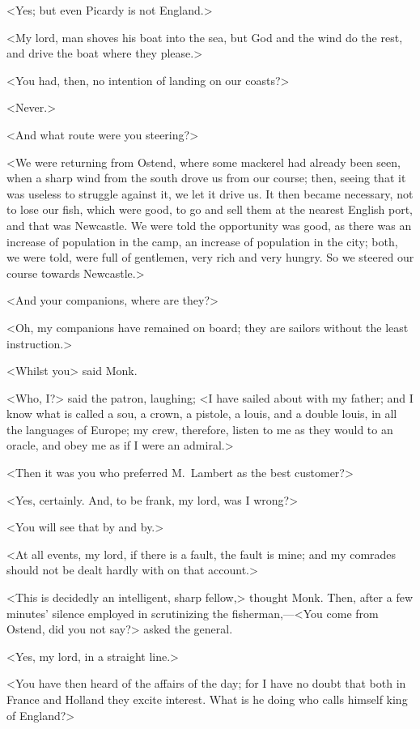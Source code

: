 <Yes; but even Picardy is not England.>

<My lord, man shoves his boat into the sea, but God and the wind do the rest, and drive the boat where they please.>

<You had, then, no intention of landing on our coasts?>

<Never.>

<And what route were you steering?>

<We were returning from Ostend, where some mackerel had already been seen, when a sharp wind from the south drove us from our course; then, seeing that it was useless to struggle against it, we let it drive us. It then became necessary, not to lose our fish, which were good, to go and sell them at the nearest English port, and that was Newcastle. We were told the opportunity was good, as there was an increase of population in the camp, an increase of population in the city; both, we were told, were full of gentlemen, very rich and very hungry. So we steered our course towards Newcastle.>

<And your companions, where are they?>

<Oh, my companions have remained on board; they are sailors without the least instruction.>

<Whilst you\longdash> said Monk.

<Who, I\@?> said the patron, laughing; <I have sailed about with my father; and I know what is called a sou, a crown, a pistole, a louis, and a double louis, in all the languages of Europe; my crew, therefore, listen to me as they would to an oracle, and obey me as if I were an admiral.>

<Then it was you who preferred M.~Lambert as the best customer?>

<Yes, certainly. And, to be frank, my lord, was I wrong?>

<You will see that by and by.>

<At all events, my lord, if there is a fault, the fault is mine; and my comrades should not be dealt hardly with on that account.>

<This is decidedly an intelligent, sharp fellow,> thought Monk. Then, after a few minutes' silence employed in scrutinizing the fisherman,—<You come from Ostend, did you not say?> asked the general.

<Yes, my lord, in a straight line.>

<You have then heard of the affairs of the day; for I have no doubt that both in France and Holland they excite interest. What is he doing who calls himself king of England?>


